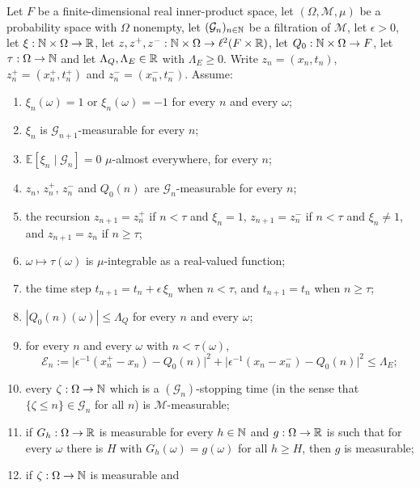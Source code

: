 \begin{lemma}
Let $F$ be a finite-dimensional real inner-product space, let
$(\Omega,\mathcal M,\mu)$ be a probability space with $\Omega$ nonempty, let
$(\mathcal G_n)_{n\in\mathbb{N}}$ be a filtration of $\mathcal M$, let $\epsilon>0$, let
$\xi:\mathbb{N}\times\Omega\to\mathbb{R}$, let $z,z^+,z^-:\mathbb{N}\times\Omega\to\ell^2(F\times\mathbb{R})$,
let $Q_0:\mathbb{N}\times\Omega\to F$, let $\tau:\Omega\to\mathbb{N}$ and let
$\Lambda_Q,\Lambda_E\in\mathbb{R}$ with $\Lambda_E\ge0$. Write $z_n=(x_n,t_n)$,
$z^+_n=(x^+_n,t^+_n)$ and $z^-_n=(x^-_n,t^-_n)$. Assume:
\begin{enumerate}
\item\label{it:sptb-pm} $\xi_n(\omega)=1$ or $\xi_n(\omega)=-1$ for every $n$
and every $\omega$;
\item\label{it:sptb-ximeas} $\xi_n$ is $\mathcal G_{n+1}$-measurable for every
$n$;
\item\label{it:sptb-xicond} $\mathbb E[\xi_n\mid\mathcal G_n]=0$ $\mu$-almost
everywhere, for every $n$;
\item\label{it:sptb-zmeas} $z_n$, $z^+_n$, $z^-_n$ and $Q_0(n)$ are
$\mathcal G_n$-measurable for every $n$;
\item\label{it:sptb-rec} the recursion
$z_{n+1}=z^+_n$ if $n<\tau$ and $\xi_n=1$, $z_{n+1}=z^-_n$ if $n<\tau$ and
$\xi_n\ne1$, and $z_{n+1}=z_n$ if $n\ge\tau$;
\item\label{it:sptb-tauint} $\omega\mapsto\tau(\omega)$ is $\mu$-integrable as
a real-valued function;
\item\label{it:sptb-tstep} the time step
$t_{n+1}=t_n+\epsilon\,\xi_n$ when $n<\tau$, and $t_{n+1}=t_n$ when
$n\ge\tau$;
\item\label{it:sptb-Qbd} $|Q_0(n)(\omega)|\le\Lambda_Q$ for every $n$ and every
$\omega$;
\item\label{it:sptb-Ebd} for every $n$ and every $\omega$ with $n<\tau(\omega)$,
\[
  \mathcal E_n
   :=\bigl|\epsilon^{-1}(x^+_n-x_n)-Q_0(n)\bigr|^2
     +\bigl|\epsilon^{-1}(x_n-x^-_n)-Q_0(n)\bigr|^2\le\Lambda_E ;
\]
\item\label{it:sptb-st} every $\zeta:\Omega\to\mathbb{N}$ which is a
$(\mathcal G_n)$-stopping time (in the sense that
$\{\zeta\le n\}\in\mathcal G_n$ for all $n$) is $\mathcal M$-measurable;
\item\label{it:sptb-lim} if $G_h:\Omega\to\mathbb{R}$ is measurable for every $h\in\mathbb{N}$
and $g:\Omega\to\mathbb{R}$ is such that for every $\omega$ there is $H$ with
$G_h(\omega)=g(\omega)$ for all $h\ge H$, then $g$ is measurable;
\item\label{it:sptb-idx} if $\zeta:\Omega\to\mathbb{N}$ is measurable and

\end{enumerate}
\end{lemma}
